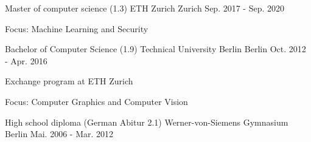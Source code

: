 

\begin{cventries}

  \cventry
    {Master of computer science (1.3)} %
    {ETH Zurich} %
    {Zurich} %
    {Sep. 2017 - Sep. 2020} %
    {
      \begin{cvitems} %
        \item {Focus: Machine Learning and Security}
      \end{cvitems}
    }


  \cventry
    {Bachelor of Computer Science (1.9)} %
    {Technical University Berlin} %
    {Berlin} %
    {Oct. 2012 - Apr. 2016} %
    {
      \begin{cvitems} %
        \item {Exchange program at ETH Zurich}
        \item {Focus: Computer Graphics and Computer Vision}
      \end{cvitems}
    }


  \cventry
    {High school diploma (German Abitur 2.1)} %
    {Werner-von-Siemens Gymnasium} %
    {Berlin} %
    {Mai. 2006 - Mar. 2012} %
    {}

\end{cventries}
